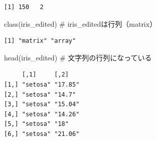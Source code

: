 \documentclass[
  letterpaper,
  DIV=11,
  numbers=noendperiod]{scrreprt}
\newenvironment{Shaded}{\begin{snugshade}}{\end{snugshade}}
\newcommand{\AttributeTok}[1]{\textcolor[rgb]{0.40,0.45,0.13}{#1}}
\newcommand{\CommentTok}[1]{\textcolor[rgb]{0.37,0.37,0.37}{#1}}
\newcommand{\ControlFlowTok}[1]{\textcolor[rgb]{0.00,0.23,0.31}{#1}}
\newcommand{\DecValTok}[1]{\textcolor[rgb]{0.68,0.00,0.00}{#1}}
\newcommand{\FunctionTok}[1]{\textcolor[rgb]{0.28,0.35,0.67}{#1}}
\newcommand{\NormalTok}[1]{\textcolor[rgb]{0.00,0.23,0.31}{#1}}
\newcommand{\OtherTok}[1]{\textcolor[rgb]{0.00,0.23,0.31}{#1}}
\newcommand{\SpecialCharTok}[1]{\textcolor[rgb]{0.37,0.37,0.37}{#1}}
\begin{document}
\begin{Shaded}
\end{Shaded}

\begin{verbatim}
[1] 150   2
\end{verbatim}

\begin{Shaded}
\begin{Highlighting}[]
\FunctionTok{class}\NormalTok{(iris\_edited) }\CommentTok{\# iris\_editedは行列（matrix）}
\end{Highlighting}
\end{Shaded}

\begin{verbatim}
[1] "matrix" "array" 
\end{verbatim}

\begin{Shaded}
\begin{Highlighting}[]
\FunctionTok{head}\NormalTok{(iris\_edited) }\CommentTok{\# 文字列の行列になっている}
\end{Highlighting}
\end{Shaded}

\begin{verbatim}
     [,1]     [,2]   
[1,] "setosa" "17.85"
[2,] "setosa" "14.7" 
[3,] "setosa" "15.04"
[4,] "setosa" "14.26"
[5,] "setosa" "18"   
[6,] "setosa" "21.06"
\end{verbatim}
\end{document}
